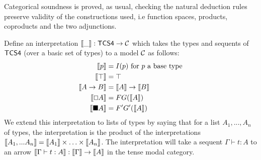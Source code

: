 Categorical soundness is proved, as usual, checking the natural
deduction rules preserve validity of the constructions used, i.e
function spaces, products, coproducts and the two adjunctions.

Define an interpretation $\sem{\_} : \sf{TCS4} \to {\cal C}$ which
takes the types and sequents of $\sf{TCS4}$ (over a basic set of
types) to a model $\cal C$ as follows:
\begin{align*}
\sem{p} &= I(p) \mbox{  for $p$ a base type}\\
\sem{\top} &= \top\\
\sem{  A \to B  } &=  \sem{ A}  \to  \sem{ B }\\
\sem{\Box A} &= F G(\sem{A})\\
\sem{\blacksquare A} &= F' G'(\sem{A})
\end{align*}
 We extend this interpretation to lists of types by saying that for a
 list $A_1, ..., A_n$ of types, the interpretation is the product of
 the interpretations $\sem{A_1,...A_n} = \sem{A_1} \times \ldots
 \times \sem{A_n}$.  The interpretation will take a sequent $\Gamma
 \vdash t : A$ to an arrow $ \sem {\Gamma \vdash t : A} : \sem{
   \Gamma} \to \sem{A} $ in the tense modal category.

